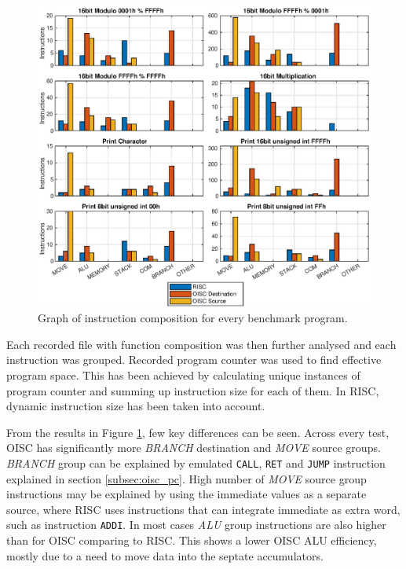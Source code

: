 \begin{figure}[t]
	\centering
	\includegraphics[width=\linewidth]{../tests/instr_comp.eps}
	\caption{Graph of instruction composition for every benchmark program.}
	\label{fig:instr_comp}
\end{figure}


Each recorded file with function composition was then further analysed and each instruction was grouped. Recorded program counter was used to find effective program space. This has been achieved by calculating unique instances of program counter and summing up instruction size for each of them. In RISC, dynamic instruction size has been taken into account. 

From the results in Figure \ref{fig:instr_comp}, few key differences can be seen. Across every test, OISC has significantly more \textit{BRANCH} destination and \textit{MOVE} source groups. \textit{BRANCH} group can be explained by emulated \texttt{CALL}, \texttt{RET} and \texttt{JUMP} instruction explained in section \ref{subsec:oisc_pc}.
High number of \textit{MOVE} source group instructions may be explained by using the immediate values as a separate source, where RISC uses instructions that can integrate immediate as extra word, such as instruction \texttt{ADDI}. In most cases \textit{ALU} group instructions are also higher than for OISC comparing to RISC. This shows a lower OISC ALU efficiency, mostly due to a need to move data into the septate accumulators.

